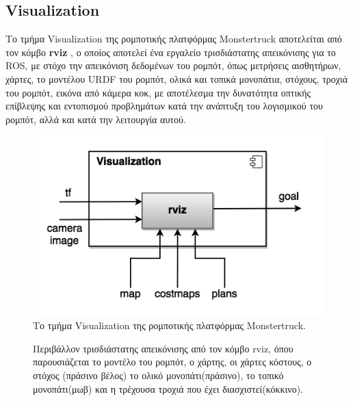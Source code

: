\subsection{Visualization}
Το τμήμα Visualization της ρομποτικής πλατφόρμας Monstertruck αποτελείται από τον κόμβο \textbf{rviz} \cite{rviz}, ο οποίος αποτελεί ένα εργαλείο τρισδιάστατης απεικόνισης για το ROS, με στόχο την απεικόνιση δεδομένων του ρομπότ, όπως μετρήσεις αισθητήρων, χάρτες, το μοντέλου URDF του ρομπότ, ολικά και τοπικά μονοπάτια, στόχους, τροχιά του ρομπότ, εικόνα από κάμερα κοκ, με αποτέλεσμα την δυνατότητα οπτικής επίβλεψης και εντοπισμού προβλημάτων κατά την ανάπτυξη του λογισμικού του ρομπότ, αλλά και κατά την λειτουργία αυτού.

\begin{figure}[!ht]
	\centering
	\includegraphics[width=0.5\linewidth]{Chapters/Chapter4/Figures/visualization_component.png}
	\caption{Το τμήμα Visualization της ρομποτικής πλατφόρμας Monstertruck.}
	\label{fig:visualization_component}
\end{figure}


\begin{figure}[!ht]
	\centering
	\caption{Περιβάλλον τρισδιάστατης απεικόνισης από τον κόμβο rviz, όπου παρουσιάζεται το μοντέλο του ρομπότ, ο χάρτης, οι χάρτες κόστους, ο στόχος (πράσινο βέλος) το ολικό μονοπάτι(πράσινο), το τοπικό μονοπάτι(μωβ) και η τρέχουσα τροχιά που έχει διασχιστεί(κόκκινο).}
	\label{fig:rviz}
\end{figure}



